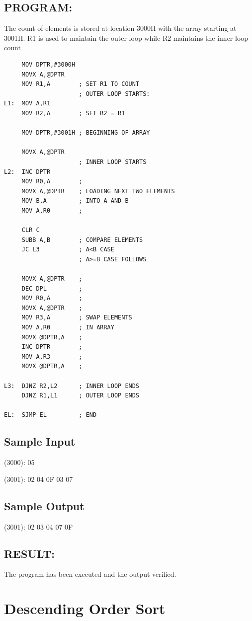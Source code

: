 \documentclass[a4paper,28pt]{report}
\begin{document}
\section*{PROGRAM:}
The count of elements is stored at location 3000H with the array starting at 3001H. R1 is used to maintain the outer loop while R2 maintains the inner loop count
\begin{lstlisting}
     MOV DPTR,#3000H
     MOVX A,@DPTR
     MOV R1,A        ; SET R1 TO COUNT
                     ; OUTER LOOP STARTS:
L1:  MOV A,R1
     MOV R2,A        ; SET R2 = R1
     
     MOV DPTR,#3001H ; BEGINNING OF ARRAY
     
     MOVX A,@DPTR
                     ; INNER LOOP STARTS
L2:  INC DPTR 
     MOV R0,A        ;
     MOVX A,@DPTR    ; LOADING NEXT TWO ELEMENTS
     MOV B,A         ; INTO A AND B 
     MOV A,R0        ;
     
     CLR C
     SUBB A,B        ; COMPARE ELEMENTS
     JC L3           ; A<B CASE
                     ; A>=B CASE FOLLOWS
            
     MOVX A,@DPTR    ;
     DEC DPL         ;
     MOV R0,A        ;
     MOVX A,@DPTR    ; 
     MOV R3,A        ; SWAP ELEMENTS
     MOV A,R0        ; IN ARRAY
     MOVX @DPTR,A    ;
     INC DPTR        ;
     MOV A,R3        ;
     MOVX @DPTR,A    ;
     
L3:  DJNZ R2,L2      ; INNER LOOP ENDS
     DJNZ R1,L1      ; OUTER LOOP ENDS
     
EL:  SJMP EL         ; END
\end{lstlisting}

\section*{Sample Input}
(3000): 05

(3001): 02
 04
 0F
 03
 07

\section*{Sample Output}
(3001): 02 
 03 
 04
 07
 0F

\section*{RESULT:}
The program has been executed and the output verified.
%
%
\chapter{Descending Order Sort}
%
%
\end{document}
